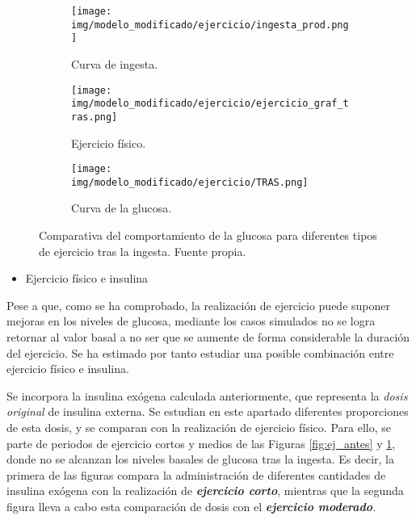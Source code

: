 \clearpage
\begin{figure}[htbp]
    \centering
    \begin{subfigure}[b]{0.9\linewidth} %
        \centering
        \texttt{[image: img/modelo\_modificado/ejercicio/ingesta\_prod.png]}
        \caption{Curva de ingesta.}
    \end{subfigure}
    
    \vspace{0.5cm} %

    \begin{subfigure}[b]{0.9\linewidth} %
        \centering
        \texttt{[image: img/modelo\_modificado/ejercicio/ejercicio\_graf\_tras.png]}
        \caption{Ejercicio físico.}
    \end{subfigure}
    
    \vspace{0.5cm} %

    \begin{subfigure}[b]{0.9\linewidth} %
        \centering
        \texttt{[image: img/modelo\_modificado/ejercicio/TRAS.png]}
        \caption{Curva de la glucosa.}
    \end{subfigure}
    
    \caption{Comparativa del comportamiento de la glucosa para diferentes tipos de ejercicio tras la ingesta. Fuente propia.}
    \label{fig:ej_despues}
\end{figure}

\clearpage

\begin{itemize}
    \item Ejercicio físico e insulina
\end{itemize}

Pese a que, como se ha comprobado, la realización de ejercicio puede suponer mejoras en los niveles de glucosa, mediante los casos simulados no se logra retornar al valor basal a no ser que se aumente de forma considerable la duración del ejercicio. Se ha estimado por tanto estudiar una posible combinación entre ejercicio físico e insulina. 

Se incorpora la insulina exógena calculada anteriormente, que representa la \textit{dosis original} de insulina externa. Se estudian en este apartado diferentes proporciones de esta dosis, y se comparan con la realización de ejercicio físico. Para ello, se parte de periodos de ejercicio cortos y medios de las Figuras \ref{fig:ej_antes} y \ref{fig:ej_despues}, donde no se alcanzan los niveles basales de glucosa tras la ingesta. Es decir, la primera de las figuras compara la administración de diferentes cantidades de insulina exógena con la realización de \textbf{\textit{ejercicio corto}}, mientras que la segunda figura lleva a cabo esta comparación de dosis con el \textbf{\textit{ejercicio moderado}}.

